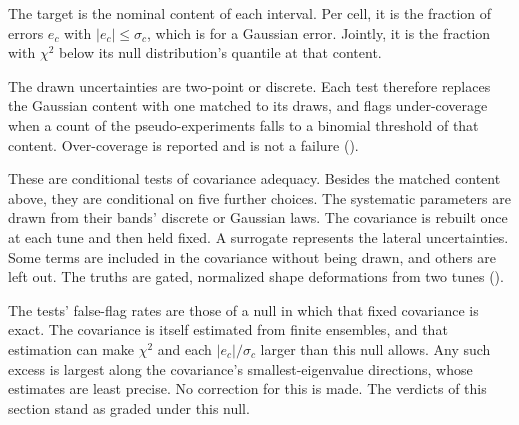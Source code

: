 The target is the nominal content of each interval. Per cell, it is the fraction of errors $e_c$ with $|e_c|\leq\sigma_c$, which is  for a Gaussian error. Jointly, it is the fraction with $\chi^2$ below its null distribution's quantile at that content.

The drawn uncertainties are two-point or discrete. Each test therefore replaces the Gaussian content with one matched to its draws, and flags under-coverage when a count of the pseudo-experiments falls to a binomial threshold of that content. Over-coverage is reported and is not a failure ().

These are conditional tests of covariance adequacy. Besides the matched content above, they are conditional on five further choices. The systematic parameters are drawn from their bands' discrete or Gaussian laws. The covariance is rebuilt once at each tune and then held fixed. A surrogate represents the lateral uncertainties. Some terms are included in the covariance without being drawn, and others are left out. The truths are gated, normalized shape deformations from two tunes ().

The tests' false-flag rates are those of a null in which that fixed covariance is exact. The covariance is itself estimated from finite ensembles, and that estimation can make $\chi^2$ and each $|e_c|/\sigma_c$ larger than this null allows. Any such excess is largest along the covariance's smallest-eigenvalue directions, whose estimates are least precise. No correction for this is made. The verdicts of this section stand as graded under this null.

